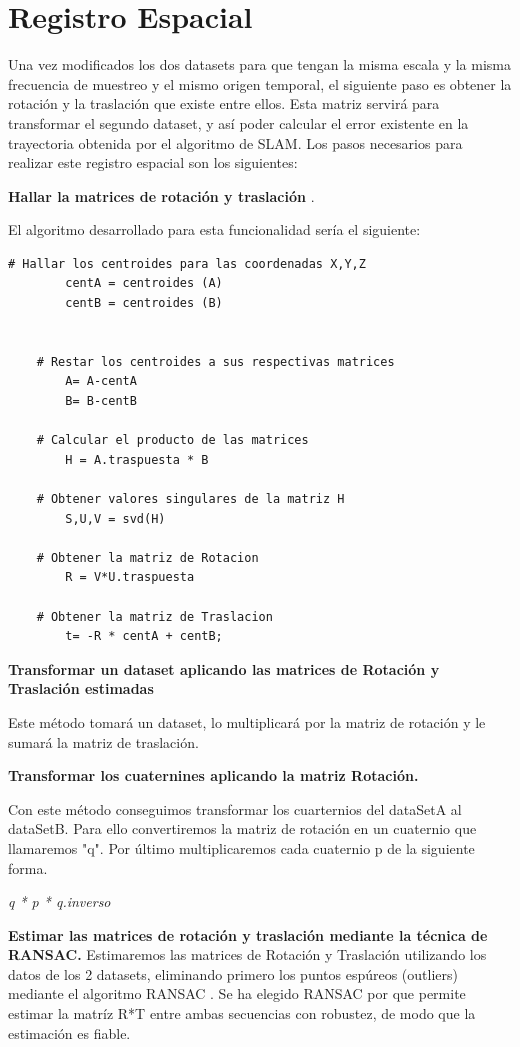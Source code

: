 \section{Registro Espacial}
Una vez modificados los dos datasets para que tengan la misma escala y la misma frecuencia de muestreo y el mismo origen temporal, el siguiente paso es obtener la rotación y la traslación que existe entre ellos. Esta matriz servirá para transformar el segundo dataset, y así poder calcular el error existente en la trayectoria obtenida por el algoritmo de SLAM.
Los pasos necesarios para realizar este registro espacial son los siguientes:

\textbf{Hallar la matrices de rotación y traslación} .

	El algoritmo desarrollado para esta funcionalidad sería el siguiente:
    \begin{lstlisting}[frame=single]
    # Hallar los centroides para las coordenadas X,Y,Z 
    	centA = centroides (A)
    	centB = centroides (B)
    

    # Restar los centroides a sus respectivas matrices
      	A= A-centA
      	B= B-centB
    
    # Calcular el producto de las matrices
    	H = A.traspuesta * B

    # Obtener valores singulares de la matriz H
    	S,U,V = svd(H)
    
    # Obtener la matriz de Rotacion
      	R = V*U.traspuesta

    # Obtener la matriz de Traslacion
    	t= -R * centA + centB;  
    \end{lstlisting}

\textbf{Transformar un dataset aplicando las matrices de Rotación y Traslación estimadas}

Este método tomará un dataset, lo multiplicará por la matriz de rotación y le sumará la matriz de traslación.

\textbf{Transformar los cuaternines aplicando la matriz Rotación.}

Con este método conseguimos transformar los cuarternios del dataSetA al dataSetB.		Para ello convertiremos la matriz de rotación en un cuaternio que llamaremos "q".		Por último multiplicaremos cada cuaternio p de la siguiente forma.
\begin{center}
		\textit{q * p * q.inverso }
\end{center}

\textbf{Estimar las matrices de rotación y traslación mediante la técnica de RANSAC.}
Estimaremos las matrices de Rotación y Traslación utilizando los datos de los 2 datasets, eliminando primero los puntos espúreos (outliers) mediante el algoritmo RANSAC \cite{Fischler:1981:RSC:358669.358692}.
Se ha elegido RANSAC por que permite estimar la matríz R*T entre ambas secuencias con robustez, de modo que la estimación es fiable.



